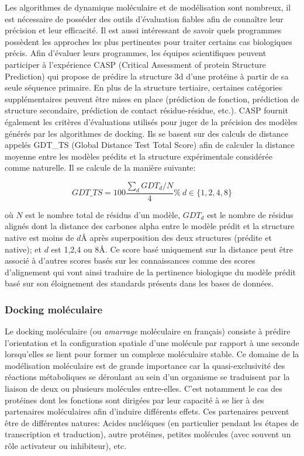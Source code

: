 Les algorithmes de dynamique moléculaire et de modélisation sont nombreux, il est nécessaire de posséder des outils d'évaluation fiables afin de connaître leur précision et leur efficacité. Il est aussi intéressant de savoir quels programmes possèdent les approches les plus pertinentes pour traiter certains cas biologiques précis. Afin d'évaluer leurs programmes, les équipes scientifiques peuvent participer à l'expérience CASP (Critical Assessment of protein Structure Prediction) qui propose de prédire la structure 3d d'une protéine à partir de sa seule séquence primaire. En plus de la structure tertiaire, certaines catégories supplémentaires peuvent être mises en place (prédiction de fonction, prédiction de structure secondaire, prédiction de contact résidue-résidue, etc.). CASP fournit également les critères d'évaluations utilisés pour juger de la précision des modèles générés par les algorithmes de docking. Ils se basent sur des calculs de distance appelés GDT\_TS (Global Distance Test Total Score) afin de calculer la distance moyenne entre les modèles prédits et la structure expérimentale considérée comme naturelle. Il se calcule de la manière suivante:

$$GDT\_TS = 100\frac{\sum_dGDT_d/N}{4}\%\ d\in\{1,2,4,8\}$$

où $N$ est le nombre total de résidus d'un modèle, $GDT_d$ est le nombre de résidus alignés dont la distance des carbones alpha entre le modèle prédit et la structure native est moins de $d$\r{A} après superposition des deux structures (prédite et native); et $d$ est 1,2,4 ou 8\r{A}.
Ce score basé uniquement sur la distance peut être associé à d'autres scores basés sur les connaissances comme des scores d'alignement qui vont ainsi traduire de la pertinence biologique du modèle prédit basé sur son éloignement des standards présents dans les bases de données.

\subsubsection{Docking moléculaire}

Le docking moléculaire (ou \textit{amarrage} moléculaire en français) consiste à prédire l'orientation et la configuration spatiale d'une molécule par rapport à une seconde lorsqu’elles se lient pour former un complexe moléculaire stable. Ce domaine de la modélisation moléculaire est de grande importance car la quasi-exclusivité des réactions métaboliques se déroulant au sein d'un organisme se traduisent par la liaison de deux ou plusieurs molécules entre-elles. C'est notamment le cas des protéines dont les fonctions sont dirigées par leur capacité à se lier à des partenaires moléculaires afin d'induire différents effets. Ces partenaires peuvent être de différentes natures: Acides nucléiques (en particulier pendant les étapes de transcription et traduction), autre protéines, petites molécules (avec souvent un rôle activateur ou inhibiteur), etc.

